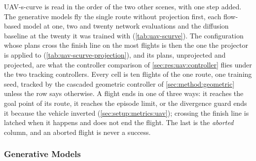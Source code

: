 UAV-s-curve is read in the order of the two other scenes, with one step added. The generative models
fly the single route without projection first, each flow-based model at one, two and twenty network
evaluations and the diffusion baseline at the twenty it was trained with (\autoref{tab:uav-scurve}). The
configuration whose plans cross the finish line on the most flights is then the one the projector is
applied to (\autoref{tab:uav-scurve-projection}), and its plans, unprojected and projected, are what the
controller comparison of \autoref{sec:res:uav:controller} flies under the two tracking controllers.
Every cell is ten flights of the one route, one training seed, tracked by the cascaded geometric
controller of \autoref{sec:method:geometric} unless the row says otherwise. A flight ends in one of
three ways: it reaches the goal point of its route, it reaches the episode limit, or the divergence guard
ends it because the vehicle inverted (\autoref{sec:setup:metrics:uav}); crossing the finish line is latched
when it happens and does not end the flight. The last is the \emph{aborted} column,
and an aborted flight is never a success.

\subsubsection{Generative Models}\label{sec:res:uav:scurve:models}

